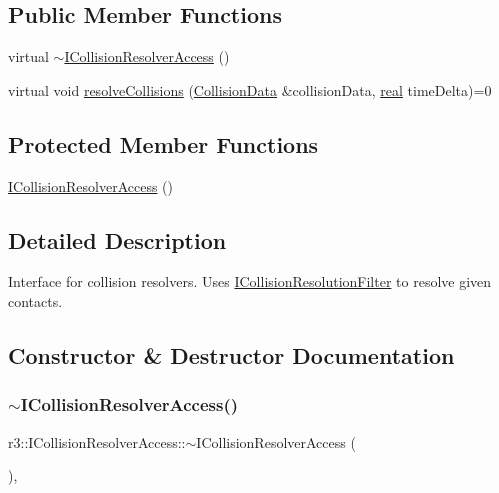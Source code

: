 \subsection*{Public Member Functions}
\begin{DoxyCompactItemize}
\item 
virtual \mbox{\hyperlink{classr3_1_1_i_collision_resolver_access_a56e8e69db0a57cb22e3c8defa8502b30}{$\sim$\+I\+Collision\+Resolver\+Access}} ()
\item 
virtual void \mbox{\hyperlink{classr3_1_1_i_collision_resolver_access_a266dfbc4c421a7c3429ef474d63fd941}{resolve\+Collisions}} (\mbox{\hyperlink{classr3_1_1_collision_data}{Collision\+Data}} \&collision\+Data, \mbox{\hyperlink{namespacer3_ab2016b3e3f743fb735afce242f0dc1eb}{real}} time\+Delta)=0
\end{DoxyCompactItemize}
\subsection*{Protected Member Functions}
\begin{DoxyCompactItemize}
\item 
\mbox{\hyperlink{classr3_1_1_i_collision_resolver_access_ade62636ccefb20b027eef0ff272d6d48}{I\+Collision\+Resolver\+Access}} ()
\end{DoxyCompactItemize}


\subsection{Detailed Description}
Interface for collision resolvers. Uses \mbox{\hyperlink{classr3_1_1_i_collision_resolution_filter}{I\+Collision\+Resolution\+Filter}} to resolve given contacts. 

\subsection{Constructor \& Destructor Documentation}
\mbox{\label{classr3_1_1_i_collision_resolver_access_a56e8e69db0a57cb22e3c8defa8502b30}} 
\subsubsection{\texorpdfstring{$\sim$\+I\+Collision\+Resolver\+Access()}{~ICollisionResolverAccess()}}
{\footnotesize\ttfamily r3\+::\+I\+Collision\+Resolver\+Access\+::$\sim$\+I\+Collision\+Resolver\+Access (\begin{DoxyParamCaption}{ }\end{DoxyParamCaption})\hspace{0.3cm}{\ttfamily [virtual]}, {\ttfamily [default]}}

